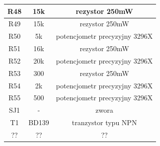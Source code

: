 \documentclass[12pt]{article}
\begin{document}
\begin{minipage}[t]{0.45\linewidth}
\begin{tabular}{|c|c|c|}
\hline
R48 & 15k & rezystor 250mW \\
\hline
R49 & 15k & rezystor 250mW \\
\hline
R50 & 5k & potencjometr precyzyjny 3296X \\
\hline
R51 & 16k & rezystor 250mW \\
\hline
R52 & 20k & potencjometr precyzyjny 3296X \\
\hline
R53 & 300 & rezystor 250mW \\
\hline
R54 & 2k & potencjometr precyzyjny 3296X \\
\hline
R55 & 500 & potencjometr precyzyjny 3296X \\
\hline
SJ1 & - & zwora \\
\hline
T1 & BD139 & tranzystor typu NPN \\
\hline
?? & ?? & ?? \\
\hline
\end{tabular}
\end{minipage}
\end{document}
